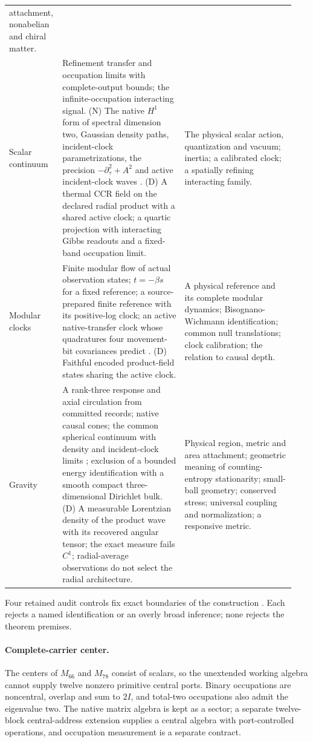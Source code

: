 \documentclass[11pt]{article}
\theoremstyle{definition}
\theoremstyle{remark}
\theoremstyle{plain}
\begin{document}
{\begin{longtable}{@{}L{0.14\linewidth}L{0.42\linewidth}L{0.38\linewidth}@{}}
attachment, nonabelian and chiral matter.\\
\addlinespace
Scalar continuum \cite{ophobservers,flagship} &
Refinement transfer and occupation limits with complete-output bounds; the
infinite-occupation interacting signal. (N) The native $H^1$ form of
spectral dimension two, Gaussian density paths, incident-clock
parametrizations, the precision $-\partial_\tau^2+A^2$ and active
incident-clock waves \cite{nativeContinuum}. (D) A thermal CCR field on the
declared radial product with a shared active clock; a quartic projection with
interacting Gibbs readouts and a fixed-band occupation limit. &
The physical scalar action, quantization and vacuum; inertia; a calibrated
clock; a spatially refining interacting family.\\
\addlinespace
Modular clocks \cite{ophspacetime} &
Finite modular flow of actual observation states; $t=-\beta s$ for a fixed
reference; a source-prepared finite reference with its positive-log clock;
an active native-transfer clock whose quadratures four movement-bit
covariances predict \cite{nativeEventClock,nativePredictions}. (D) Faithful
encoded product-field states sharing the active clock. &
A physical reference and its complete modular dynamics;
Bisognano-Wichmann identification; common null translations; clock
calibration; the relation to causal depth.\\
\addlinespace
Gravity \cite{ophspacetime} &
A rank-three response and axial circulation from committed records; native
causal cones; the common spherical continuum with density and incident-clock
limits \cite{nativeContinuum}; exclusion of a bounded energy identification
with a smooth compact three-dimensional Dirichlet bulk. (D) A measurable
Lorentzian density of the product wave with its recovered angular tensor;
the exact measure fails $C^1$; radial-average observations do not select the
radial architecture. &
Physical region, metric and area attachment; geometric meaning of
counting-entropy stationarity; small-ball geometry; conserved stress;
universal coupling and normalization; a responsive metric.\\
\bottomrule
\end{longtable}
}

Four retained audit controls fix exact boundaries of the construction
\cite{mCONSTRUCTION}. Each rejects a named identification or an overly broad
inference; none rejects the theorem premises.

\paragraph{Complete-carrier center.} The centers of $M_{66}$ and $M_{78}$
consist of scalars, so the unextended working algebra cannot supply twelve
nonzero primitive central ports. Binary occupations are noncentral, overlap
and sum to $2I$, and total-two occupations also admit the eigenvalue two. The
native matrix algebra is kept as a sector; a separate twelve-block
central-address extension supplies a central algebra with port-controlled
operations, and occupation measurement is a separate contract.
\end{document}
